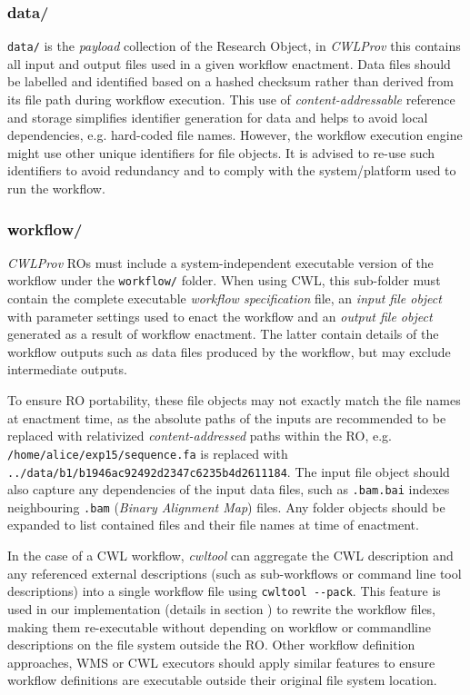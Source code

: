 \documentclass[a4paper,num-refs]{oup-contemporary}
\begin{document}
\subsubsection{\textcolor{black}data/} 
\texttt{data/} is the \emph{payload} collection of the Research Object, in \textit{CWLProv} this contains all input and output files used in a given workflow enactment. Data files should be labelled and identified based on a hashed checksum rather than derived from its file path during workflow execution. This use of \emph{content-addressable} reference and storage \citep{services_2012} simplifies identifier generation for data and helps to avoid local dependencies, e.g. hard-coded file names. However, the workflow execution engine might use other unique identifiers for file objects. It is advised to re-use such identifiers to avoid redundancy and to comply with the system/platform used to run the workflow. 

\subsubsection{ \textcolor{black}workflow/}
\textit{CWLProv} ROs must include a system-independent executable version of the workflow under the \texttt{workflow/} folder. When using CWL, this sub-folder must contain the complete executable \emph{workflow specification} file, an \emph{input file object} with parameter settings used to enact the workflow and an \emph{output file object} generated as a result of workflow enactment. The latter contain details of the workflow outputs such as data files produced by the workflow, but may exclude intermediate outputs. 

To ensure RO portability, these file objects may not exactly match the file names at enactment time, as the absolute paths of the inputs are recommended to be replaced with relativized \emph{content-addressed} paths within the RO, e.g. \texttt{/home/alice/exp15/sequence.fa} is replaced with \texttt{../data/b1/b1946ac92492d2347c6235b4d2611184}. The input file object should also capture any dependencies of the input data files, such as \texttt{.bam.bai} indexes neighbouring \texttt{.bam} (\emph{Binary Alignment Map}) files. Any folder objects should be expanded to list contained files and their file names at time of enactment.

In the case of a CWL workflow, \textit{cwltool} can aggregate the CWL description and any referenced external descriptions (such as sub-workflows or command line tool descriptions) into a single workflow file using \texttt{cwltool -{}-pack}. This feature is used in our implementation (details in section \textbf{}) to rewrite the workflow files, making them re-executable without depending on workflow or commandline descriptions on the file system outside the RO. Other workflow definition approaches, WMS or CWL executors should apply similar features to ensure workflow definitions are executable outside their original file system location. 
\end{document}
